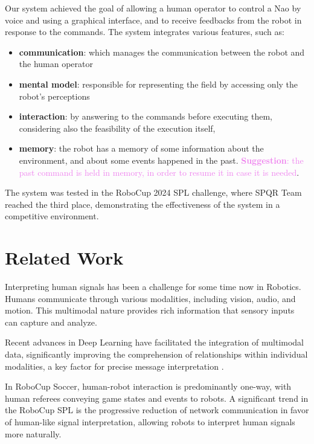 \documentclass[a4paper, onecolumn, 12pt]{article}
\newcommand\suggestion[1]{\textcolor{violet}{\textbf{Suggestion}: #1}}
\begin{document}
Our system achieved the goal of allowing a human operator to control a Nao
by voice and using a graphical interface, and to receive feedbacks from the robot
in response to the commands. The system integrates various features, such as:
\begin{itemize}
    \item \textbf{communication}: which manages the communication between the robot and
    the human operator
    \item \textbf{mental model}: responsible for representing the field by
    accessing only the robot's perceptions
    \item \textbf{interaction}: by answering to the commands before executing
    them, considering also the feasibility of the execution itself,
    \item \textbf{memory}: the robot has a memory of some information about the 
    environment, and about some events happened in the past.
    \suggestion{the past command is held in memory, in order to
    resume it in case it is needed}.
\end{itemize}
The system was tested in the RoboCup 2024 SPL challenge, where SPQR Team reached
the third place, demonstrating the effectiveness of the system in a competitive
environment.

\newpage

\section{Related Work}
\label{sec:rel}

Interpreting human signals has been a challenge for some time now in Robotics.
Humans communicate through various modalities, including vision, audio, and
motion. This multimodal nature provides rich information that sensory inputs can
capture and analyze. 

Recent advances in Deep Learning have facilitated the
integration of multimodal data, significantly improving the comprehension of
relationships within individual modalities, a key factor for precise message
interpretation \cite{LIU20183} \cite{su2023recent}.

In RoboCup Soccer, human-robot interaction is predominantly one-way, with human
referees conveying game states and events to robots. A significant trend in the
RoboCup SPL is the progressive reduction of network communication in
favor of human-like signal interpretation, allowing robots to interpret human
signals more naturally. \cite{digiambattista}
\end{document}

